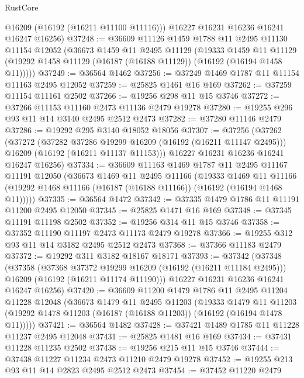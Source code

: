 \begin{lexlean}{RustCore}
\begin{coremodule}
        @16209
        (@16192 (@16211 @11100 @11116)))
      @16227
      @16231
      @16236
      @16241
      @16247
      @16256)
@37248 := @36609
    @11126
    @1459
    @1788
    @11
    @2495
    @11130
    @11154
    @12052
    (@36673
      @1459
      @11
      @2495
      @11129
      (@19333
        @1459
        @11
        @11129
        (@19292 @1458 @11129 (@16187 (@16188 @11129)) (@16192 (@16194 @1458 @11)))))
@37249 := @36564 @1462
@37256 := @37249 @1469 @1787 @11 @11154 @11163 @2495 @12052
@37259 := @25825 @1461 @16 @169
@37262 := @37259 @11154 @11161 @2502
@37266 := @19256 @298 @11 @15 @3746
@37272 := @37266 @11153 @11160 @2473 @11136 @2479 @19278
@37280 := @19255 @296 @93 @11 @14 @3140 @2495 @2512 @2473
@37282 := @37280 @11146 @2479
@37286 := @19292 @295 @3140 @18052 @18056
@37307 := @37256
    (@37262
      (@37272
        (@37282 @37286 @19299 @16209 (@16192 (@16211 @11147 @2495)))
        @16209
        (@16192 (@16211 @11137 @11153)))
      @16227
      @16231
      @16236
      @16241
      @16247
      @16256)
@37334 := @36609
    @11163
    @1469
    @1787
    @11
    @2495
    @11167
    @11191
    @12050
    (@36673
      @1469
      @11
      @2495
      @11166
      (@19333
        @1469
        @11
        @11166
        (@19292 @1468 @11166 (@16187 (@16188 @11166)) (@16192 (@16194 @1468 @11)))))
@37335 := @36564 @1472
@37342 := @37335 @1479 @1786 @11 @11191 @11200 @2495 @12050
@37345 := @25825 @1471 @16 @169
@37348 := @37345 @11191 @11198 @2502
@37352 := @19256 @314 @11 @15 @3746
@37358 := @37352 @11190 @11197 @2473 @11173 @2479 @19278
@37366 := @19255 @312 @93 @11 @14 @3182 @2495 @2512 @2473
@37368 := @37366 @11183 @2479
@37372 := @19292 @311 @3182 @18167 @18171
@37393 := @37342
    (@37348
      (@37358
        (@37368 @37372 @19299 @16209 (@16192 (@16211 @11184 @2495)))
        @16209
        (@16192 (@16211 @11174 @11190)))
      @16227
      @16231
      @16236
      @16241
      @16247
      @16256)
@37420 := @36609
    @11200
    @1479
    @1786
    @11
    @2495
    @11204
    @11228
    @12048
    (@36673
      @1479
      @11
      @2495
      @11203
      (@19333
        @1479
        @11
        @11203
        (@19292 @1478 @11203 (@16187 (@16188 @11203)) (@16192 (@16194 @1478 @11)))))
@37421 := @36564 @1482
@37428 := @37421 @1489 @1785 @11 @11228 @11237 @2495 @12048
@37431 := @25825 @1481 @16 @169
@37434 := @37431 @11228 @11235 @2502
@37438 := @19256 @215 @11 @15 @3746
@37444 := @37438 @11227 @11234 @2473 @11210 @2479 @19278
@37452 := @19255 @213 @93 @11 @14 @2823 @2495 @2512 @2473
@37454 := @37452 @11220 @2479

\end{coremodule}
\end{lexlean}
